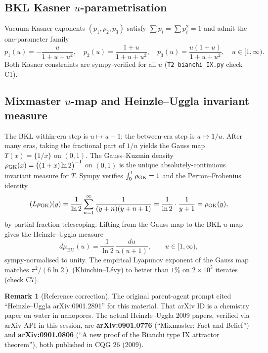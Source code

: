 \documentclass[11pt,a4paper]{article}
\theoremstyle{definition}
\newtheorem{remark}[theorem]{Remark}
\newcommand{\rmHU}{\mathrm{HU}}
\begin{document}
\subsection{BKL Kasner $u$-parametrisation}

Vacuum Kasner exponents $(p_1,p_2,p_3)$ satisfy $\sum p_i=\sum p_i^2=1$ and
admit the one-parameter family
\begin{equation}
  p_1(u)=-\frac{u}{1+u+u^2},\quad
  p_2(u)=\frac{1+u}{1+u+u^2},\quad
  p_3(u)=\frac{u(1+u)}{1+u+u^2},\quad u\in[1,\infty).
\end{equation}
Both Kasner constraints are sympy-verified for all $u$
(\texttt{T2\_bianchi\_IX.py} check C1).

\subsection{Mixmaster $u$-map and Heinzle--Uggla invariant measure}

The BKL within-era step is $u\mapsto u-1$; the between-era step is
$u\mapsto 1/u$. After many eras, taking the fractional part of $1/u$ yields
the Gauss map $T(x)=\{1/x\}$ on $(0,1)$. The Gauss--Kuzmin density
$\rho_{\rm GK}(x)=\bigl((1+x)\ln 2\bigr)^{-1}$ on $(0,1)$ is the unique
absolutely-continuous invariant measure for $T$. Sympy verifies
$\int_0^1\rho_{\rm GK}=1$ and the Perron--Frobenius identity
\begin{equation}
  (L\rho_{\rm GK})(y)
  =\frac{1}{\ln 2}\sum_{n=1}^\infty\frac{1}{(y+n)(y+n+1)}
  =\frac{1}{\ln 2}\cdot\frac{1}{y+1}=\rho_{\rm GK}(y),
\end{equation}
by partial-fraction telescoping. Lifting from the Gauss map to the BKL
$u$-map gives the Heinzle--Uggla measure
\begin{equation}
  d\mu_\rmHU(u)=\frac{1}{\ln 2}\,\frac{du}{u(u+1)},\qquad u\in[1,\infty),
\end{equation}
sympy-normalised to unity. The empirical Lyapunov exponent of the Gauss
map matches $\pi^2/(6\ln 2)$ (Khinchin--L\'evy) to better than $1\%$ on
$2\!\times\!10^5$ iterates (check C7).

\begin{remark}[Reference correction]
The original parent-agent prompt cited
``Heinzle--Uggla arXiv:0901.2891'' for this material. That arXiv ID is
a chemistry paper on water in nanopores. The actual Heinzle--Uggla 2009
papers, verified via arXiv API in this session, are
\textbf{arXiv:0901.0776} (``Mixmaster: Fact and Belief'') and
\textbf{arXiv:0901.0806} (``A new proof of the Bianchi type IX attractor
theorem''), both published in CQG 26 (2009).
\end{remark}
\end{document}

